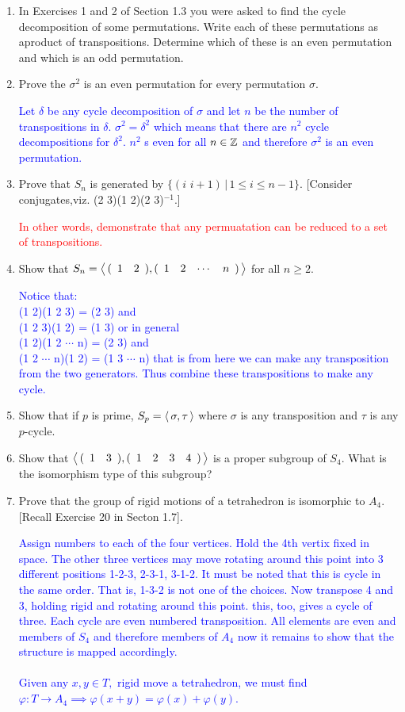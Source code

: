\documentclass[10pt,a4paper]{report}
\newcommand{\RED}[1]{\textcolor{red}{#1}}
\newcommand{\BLUE}[1]{\textcolor{blue}{#1}}
\begin{document}
\begin{enumerate}
\item In Exercises 1 and 2 of Section 1.3 you were asked to find the cycle decomposition of some permutations.  Write each of these permutations as aproduct of transpositions.  Determine which of these is an even permutation and which is an odd permutation.

\item Prove the $\sigma^2$ is an even permutation for every permutation $\sigma$.

\BLUE{Let $\delta$ be any cycle decomposition of $\sigma$ and let $n$ be the number of transpositions in $\delta$.  $\sigma^2=\delta^2$ which means that there are $n^2$ cycle decompositions for $\delta^2$.  $n^2$ s even for all $n\in \mathbb{Z}$ and therefore $\sigma^2$ is an even permutation.
}

\item Prove that $S_n$ is generated by $\{(i\,\, i+1)\,|\, 1 \le i \le n-1\}$.  [Consider conjugates,viz.  (2 3)(1 2)(2 3)$^{-1}$.]

\RED{In other words, demonstrate that any permuatation can be reduced to a set of transpositions.}

\item Show that $S_n=\left \langle\, (\begin{array}{cccccccccc} 1&2 \end{array}), (\begin{array}{cccccccccc} 1&2&\cdots&n \end{array}) \,\right \rangle$ for all $n \ge 2$.

\BLUE{Notice that:\\
(1 2)(1 2 3) = (2 3) and \\
(1 2 3)(1 2) = (1 3) or in general\\
(1 2)(1 2 $\cdots$ n) = (2 3) and \\
(1 2 $\cdots$ n)(1 2) = (1 3 $\cdots$ n) that is from here we can make any transposition from the two generators.  Thus combine these transpositions to make any cycle.
}

\item Show that if $p$ is prime, $S_p=\left \langle\, \sigma,\tau \,\right \rangle$ where $\sigma$ is any transposition and $\tau$ is any $p$-cycle.

\item Show that $\left \langle\, (\begin{array}{cccccccccc} 1&3 \end{array}), (\begin{array}{cccccccccc} 1&2&3&4 \end{array}) \,\right \rangle$ is a proper subgroup of $S_4$.  What is the isomorphism type of this subgroup?

\item Prove that the group of rigid motions of a tetrahedron is isomorphic to $A_4$.  [Recall Exercise 20 in Secton 1.7].

\BLUE{Assign numbers to each of the four vertices.  Hold the 4th vertix fixed in space.  The other three vertices may move rotating around this point into 3 different positions 1-2-3, 2-3-1, 3-1-2.  It must be noted that this is cycle in the same order.  That is, 1-3-2 is not one of the choices.  Now transpose 4 and 3, holding rigid and rotating around this point.  this, too, gives a cycle of three.  Each cycle are even numbered transposition.  All elements are even and members of $S_4$ and therefore members of $A_4$ now it remains to show that the structure is mapped accordingly.\\
\\Given any $x,y \in T,$ rigid move a tetrahedron, we must find $\varphi : T \to A_4 \implies \varphi(x+y)= \varphi(x)+\varphi(y)$.
}


\end{enumerate}
\end{document}
